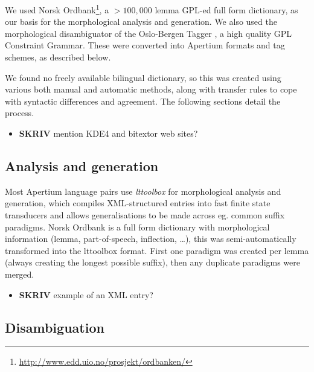 \documentclass[11pt]{article}
\begin{document}
We used Norsk Ordbank\footnote{\href{http://www.edd.uio.no/prosjekt/ordbanken/}{http://www.edd.uio.no/prosjekt/ordbanken/} }, a $>100,000$ lemma GPL-ed full form
dictionary, as our basis for the morphological analysis and
generation. We also used the morphological disambiguator of the
Oslo-Bergen Tagger \citep{hagen2000cbt}, a high quality GPL Constraint
Grammar. These were converted into Apertium formats and tag schemes,
as described below.

We found no freely available bilingual dictionary, so this was created
using various both manual and automatic methods, along with transfer
rules to cope with syntactic differences and agreement. The following
sections detail the process.
\begin{itemize}

\item \textbf{SKRIV} mention KDE4 and bitextor web sites?\\
\label{sec-3.1.1}

\end{itemize} %
\subsection{Analysis and generation}
\label{sec-3.2}

Most Apertium language pairs use \emph{lttoolbox} for morphological
analysis and generation, which compiles XML-structured entries into
fast finite state transducers and allows generalisations to be made
across eg. common suffix paradigms. Norsk Ordbank is a full form
dictionary with morphological information (lemma, part-of-speech,
inflection, \ldots{}), this was semi-automatically transformed into the
lttoolbox format. First one paradigm was created per lemma (always
creating the longest possible suffix), then any duplicate paradigms
were merged.
\begin{itemize}

\item \textbf{SKRIV} example of an XML entry?\\
\label{sec-3.2.1}

\end{itemize} %
\subsection{Disambiguation}
\label{sec-3.3}
\end{document}
